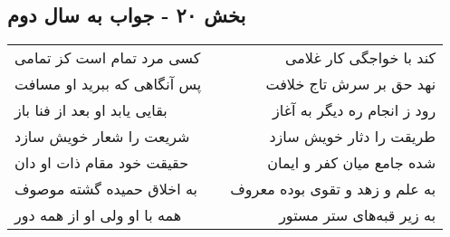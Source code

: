 \begin{center}
\section*{بخش ۲۰ - جواب به سال دوم}
\label{sec:sh020}
\begin{longtable}{l p{0.5cm} r}
کسی مرد تمام است کز تمامی
&&
کند با خواجگی کار غلامی
\\
پس آنگاهی که ببرید او مسافت
&&
نهد حق بر سرش تاج خلافت
\\
بقایی یابد او بعد از فنا باز
&&
رود ز انجام ره دیگر به آغاز
\\
شریعت را شعار خویش سازد
&&
طریقت را دثار خویش سازد
\\
حقیقت خود مقام ذات او دان
&&
شده جامع میان کفر و ایمان
\\
به اخلاق حمیده گشته موصوف
&&
به علم و زهد و تقوی بوده معروف
\\
همه با او ولی او از همه دور
&&
به زیر قبه‌های ستر مستور
\\
\end{longtable}
\end{center}
